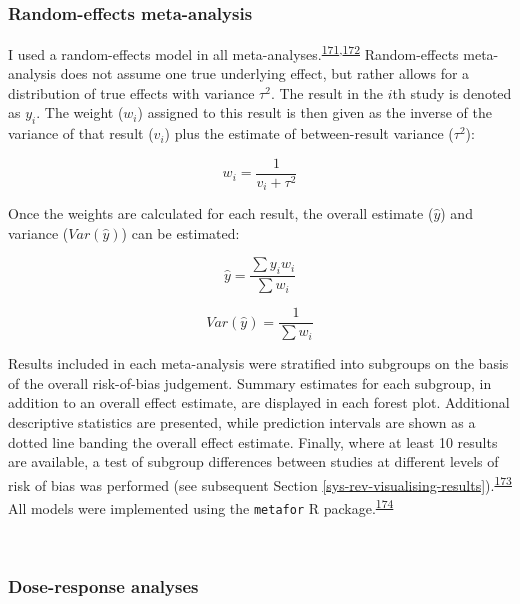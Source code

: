 \documentclass[a4paper, twoside]{templates/ociamthesis}
\begin{document}
~

\hypertarget{meta-analysis-methods}{%
\subsubsection{Random-effects meta-analysis}\label{meta-analysis-methods}}

I used a random-effects model in all meta-analyses.\textsuperscript{\protect\hyperlink{ref-hedges1998}{171},\protect\hyperlink{ref-dersimonian1986}{172}} Random-effects meta-analysis does not assume one true underlying effect, but rather allows for a distribution of true effects with variance \(\tau^2\). The result in the \(i\)th study is denoted as \(y_i\). The weight (\(w_i\)) assigned to this result is then given as the inverse of the variance of that result (\(v_i\)) plus the estimate of between-result variance (\(\tau^2\)):

\begin{equation}
w_i = \frac{1}{v_i+\tau^2}
  \label{eq:ivweighting}
\end{equation}

Once the weights are calculated for each result, the overall estimate (\(\hat{y}\)) and variance (\(Var(\hat{y})\)) can be estimated:

\begin{equation}
\hat{y} = \frac{\sum{y_iw_i}}{\sum{w_i}}
  \label{eq:rmaEstimate}
\end{equation}

\begin{equation}
Var(\hat{y}) = \frac{1}{\sum{w_i}}
  \label{eq:rmaVariance}
\end{equation}

Results included in each meta-analysis were stratified into subgroups on the basis of the overall risk-of-bias judgement. Summary estimates for each subgroup, in addition to an overall effect estimate, are displayed in each forest plot. Additional descriptive statistics are presented, while prediction intervals are shown as a dotted line banding the overall effect estimate. Finally, where at least 10 results are available, a test of subgroup differences between studies at different levels of risk of bias was performed (see subsequent Section \ref{sys-rev-visualising-results}).\textsuperscript{\protect\hyperlink{ref-deeks2019}{173}} All models were implemented using the \texttt{metafor} R package.\textsuperscript{\protect\hyperlink{ref-R-metafor}{174}}

~

\hypertarget{dose-response-analyses}{%
\subsubsection{Dose-response analyses}\label{dose-response-analyses}}
\end{document}
